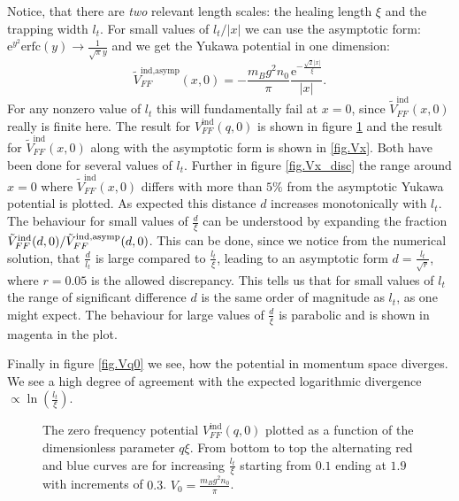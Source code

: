 Notice, that there are \textit{two} relevant length scales: the healing length $\xi$ and the trapping width $l_t$. For small values of $l_t/|x|$ we can use the asymptotic form: $\text{e}^{y^2}\text{erfc}(y) \to \frac{1}{\sqrt{\pi}y}$ and we get the Yukawa potential in one dimension:
\begin{equation}
\tilde{V}_{FF}^\text{ind,asymp}(x,0) = -\frac{m_Bg^2n_0}{\pi}\frac{\text{e}^{-\frac{\sqrt{2}|x|}{\xi}}}{|x|}.
\label{eq.Vx_asymp}
\end{equation}
For any nonzero value of $l_t$ this will fundamentally fail at $x=0$, since $\tilde{V}_{FF}^\text{ind}(x,0)$ really is finite here. The result for $V_{FF}^\text{ind}(q,0)$ is shown in figure \ref{fig.Vq} and the result for $\tilde{V}_{FF}^\text{ind}(x,0)$ along with the asymptotic form is shown in \ref{fig.Vx}. Both have been done for several values of $l_t$. Further in figure \ref{fig.Vx_disc} the range around $x=0$ where $\tilde{V}_{FF}^\text{ind}(x,0)$ differs with more than $5\%$ from the asymptotic Yukawa potential is plotted. As expected this distance $d$ increases monotonically with $l_t$. The behaviour for small values of $\frac{d}{\xi}$ can be understood by expanding the fraction $\tilde{V}_{FF}^\text{ind}(d,0)/\tilde{V}_{FF}^\text{ind,\text{asymp}}(d,0)$. This can be done, since we notice from the numerical solution, that $\frac{d}{l_t}$ is large compared to $\frac{l_t}{\xi}$, leading to an asymptotic form $d = \frac{l_t}{\sqrt{r}}$, where $r=0.05$ is the allowed discrepancy. This tells us that for small values of $l_t$ the range of significant difference $d$ is the same order of magnitude as $l_t$, as one might expect. The behaviour for large values of $\frac{d}{\xi}$ is parabolic and is shown in magenta in the plot.  

Finally in figure \ref{fig.Vq0} we see, how the potential in momentum space diverges. We see a high degree of agreement with the expected logarithmic divergence $\propto \ln\left(\frac{l_t}{\xi}\right)$. 

\begin{figure} 
\begin{center}  
  
\caption{The zero frequency potential $V_{FF}^\text{ind}(q,0)$ plotted as a function of the dimensionless parameter $q\xi$. From bottom to top the alternating red and blue curves are for increasing $\frac{l_t}{\xi}$ starting from $0.1$ ending at $1.9$ with increments of $0.3$. $V_0 = \frac{m_Bg^2n_0}{\pi}$.}  
\label{fig.Vq}  
\end{center}    
\end{figure}


